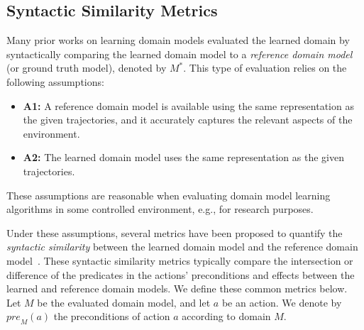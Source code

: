 \documentclass[letterpaper]{article} %
\newcommand{\pre}{\ensuremath{\textit{pre}}\xspace}
\newcommand{\realm}{{\ensuremath{M^*}}\xspace}
\newif\ifaddcomments
\newcommand{\roni}[1]{\ifaddcomments{\textcolor{red}{[Roni: #1]}}\fi}
\newcommand{\cm}[1]{\ifaddcomments{\textcolor{olive}{[Christian: #1]}}\fi}
\begin{document}
\subsection{Syntactic Similarity Metrics}
Many prior works on learning domain models evaluated the learned domain by syntactically comparing the learned domain model to a \emph{reference domain model} (or ground truth model), denoted by $\realm$. This type of evaluation relies on the following assumptions:
\begin{itemize}
    \item \textbf{A1:} A reference domain model 
    is available using the same representation as the given trajectories, and it accurately captures the relevant aspects of the environment. 
    \item \textbf{A2:} The learned domain model uses the same representation as the given trajectories. 
\end{itemize}
These assumptions are reasonable when evaluating domain model learning algorithms in some controlled environment, e.g., for research purposes. 



Under these assumptions, several metrics have been proposed to quantify the \emph{syntactic similarity} between the learned domain model and the reference domain model~\citep{aineto2019learning,mordoch2023safe,xi2024neuro,Oswald2024DLLMDomainModeling}.
These syntactic similarity metrics typically compare the intersection or difference of the predicates in the actions' preconditions and effects between the learned and reference domain models. We define these common metrics below. 
Let $M$ be the evaluated domain model, and let $a$ be an action. We denote by $\pre_M(a)$ the preconditions of action $a$ according to domain $M$.

\end{document}
